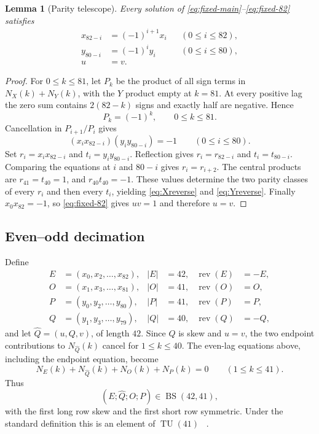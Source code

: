 \documentclass[11pt]{article}
\newtheorem{lemma}[theorem]{Lemma}
\theoremstyle{remark}
\newcommand{\BS}{\operatorname{BS}}
\newcommand{\TU}{\operatorname{TU}}
\newcommand{\rev}{\operatorname{rev}}
\begin{document}
\begin{lemma}[Parity telescope]\label{lem:telescope}
Every solution of \eqref{eq:fixed-main}--\eqref{eq:fixed-82} satisfies
\begin{align}
 x_{82-i}&=(-1)^{i+1}x_i &&(0\leq i\leq82), \label{eq:Xreverse}\\
 y_{80-i}&=(-1)^iy_i     &&(0\leq i\leq80), \label{eq:Yreverse}\\
 u&=v.                                             \label{eq:uv}
\end{align}
\end{lemma}

\begin{proof}
For $0\leq k\leq81$, let $P_k$ be the product of all sign terms in
$N_X(k)+N_Y(k)$, with the $Y$ product empty at $k=81$.  At every positive
lag the zero sum contains $2(82-k)$ signs and exactly half are negative.
Hence
\[
 P_k=(-1)^k,\qquad 0\leq k\leq81.
\]
Cancellation in $P_{i+1}/P_i$ gives
\[
 (x_ix_{82-i})(y_iy_{80-i})=-1
 \qquad(0\leq i\leq80).
\]
Set $r_i=x_ix_{82-i}$ and $t_i=y_iy_{80-i}$.  Reflection gives
$r_i=r_{82-i}$ and $t_i=t_{80-i}$.  Comparing the equations at $i$ and
$80-i$ gives $r_i=r_{i+2}$.  The central products are
$r_{41}=t_{40}=1$, and $r_{40}t_{40}=-1$.  These values determine the two
parity classes of every $r_i$ and then every $t_i$, yielding
\eqref{eq:Xreverse} and \eqref{eq:Yreverse}.  Finally
$x_0x_{82}=-1$, so \eqref{eq:fixed-82} gives $uv=1$ and therefore $u=v$.
\end{proof}

\subsection{Even--odd decimation}

Define
\begin{align*}
 E&=(x_0,x_2,\ldots,x_{82}), & |E|&=42,& \rev(E)&=-E,\\
 O&=(x_1,x_3,\ldots,x_{81}), & |O|&=41,& \rev(O)&= O,\\
 P&=(y_0,y_2,\ldots,y_{80}), & |P|&=41,& \rev(P)&= P,\\
 Q&=(y_1,y_3,\ldots,y_{79}), & |Q|&=40,& \rev(Q)&=-Q,
\end{align*}
and let $\widehat Q=(u,Q,v)$, of length $42$.  Since $Q$ is skew and
$u=v$, the two endpoint contributions to $N_{\widehat Q}(k)$ cancel for
$1\leq k\leq40$.  The even-lag equations above, including the endpoint
equation, become
\[
 N_E(k)+N_{\widehat Q}(k)+N_O(k)+N_P(k)=0
 \qquad(1\leq k\leq41).
\]
Thus
\[
 (E;\widehat Q;O;P)\in\BS(42,41),
\]
with the first long row skew and the first short row symmetric.  Under the
standard definition this is an element of $\TU(41)$
~\cite{djokovic-quadruples,edmondson}.
\end{document}
